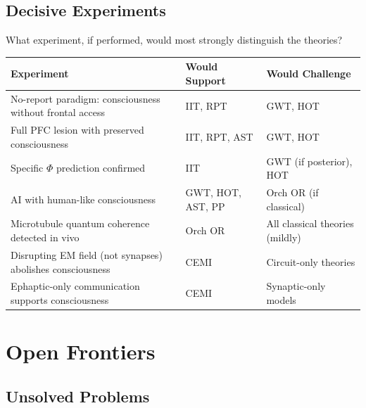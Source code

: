 \documentclass[11pt,a4paper]{report}
\begin{document}
\section{Decisive Experiments}

What experiment, if performed, would most strongly distinguish the theories?

\begin{center}
\renewcommand{\arraystretch}{1.35}
\small
\begin{tabular}{>{\raggedright}p{4.5cm} >{\raggedright}p{3.5cm} >{\raggedright\arraybackslash}p{5cm}}
  \toprule
  \textbf{Experiment} & \textbf{Would Support} & \textbf{Would Challenge} \\
  \midrule
  No-report paradigm: consciousness without frontal access & IIT, RPT & GWT, HOT \\
  Full PFC lesion with preserved consciousness & IIT, RPT, AST & GWT, HOT \\
  Specific $\Phi$ prediction confirmed & IIT & GWT (if posterior), HOT \\
  AI with human-like consciousness & GWT, HOT, AST, PP & Orch OR (if classical) \\
  Microtubule quantum coherence detected in vivo & Orch OR & All classical theories (mildly) \\
  Disrupting EM field (not synapses) abolishes consciousness & CEMI & Circuit-only theories \\
  Ephaptic-only communication supports consciousness & CEMI & Synaptic-only models \\
  \bottomrule
\end{tabular}
\end{center}


\chapter{Open Frontiers}

\section{Unsolved Problems}
\end{document}
